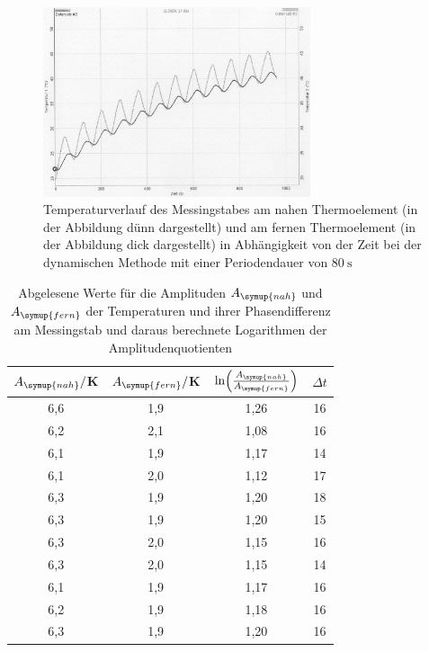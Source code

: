 \begin{figure}
  \centering
  \includegraphics[width=0.7\textwidth]{data/t1undt2_welle.JPEG}
  \caption{Temperaturverlauf des Messingstabes am nahen Thermoelement (in der Abbildung dünn dargestellt)
  und am fernen Thermoelement (in der Abbildung dick dargestellt) in Abhängigkeit von der Zeit bei der
  dynamischen Methode mit einer Periodendauer von $\SI{80}{\second}$}
  \label{fig:messing_welle}
\end{figure}

\begin{table}
  \centering
  \caption{Abgelesene Werte für die Amplituden $A_{\symup{nah}}$ und $A_{\symup{fern}}$ der Temperaturen und
  ihrer Phasendifferenz am Messingstab und daraus berechnete Logarithmen der Amplitudenquotienten}
  \label{tab:messing_welle}
  \begin{tabular}{c c c c}
    \toprule
     $A_{\symup{nah}}/$K  & $A_{\symup{fern}}/$K & $\ln\Bigl(\frac{A_{\symup{nah}}}{A_{\symup{fern}}}\Bigr)$ & $\Delta t$ \\
    \midrule
    6,6 & 1,9 & 1,26  & 16  \\
    6,2 & 2,1 & 1,08  & 16  \\
    6,1 & 1,9 & 1,17  & 14  \\
    6,1 & 2,0 & 1,12  & 17  \\
    6,3 & 1,9 & 1,20  & 18  \\
    6,3 & 1,9 & 1,20  & 15  \\
    6,3 & 2,0 & 1,15  & 16  \\
    6,3 & 2,0 & 1,15  & 14  \\
    6,1 & 1,9 & 1,17  & 16  \\
    6,2 & 1,9 & 1,18  & 16  \\
    6,3 & 1,9 & 1,20  & 16  \\
    \bottomrule
  \end{tabular}
\end{table}

